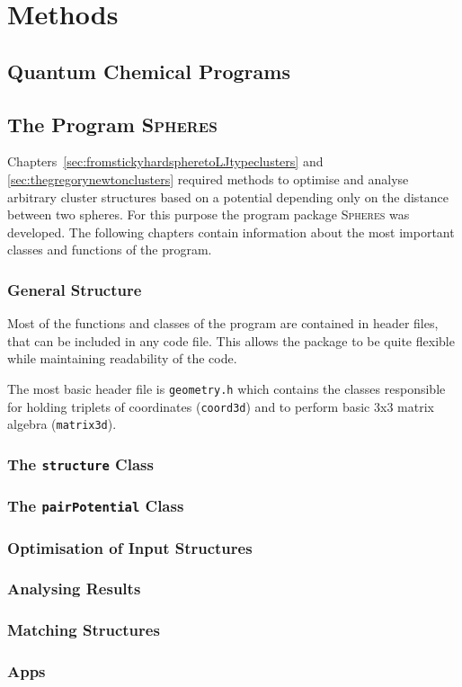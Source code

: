 
\part{Methods}
\label{sec:methods}

\chapter{Quantum Chemical Programs}
\label{sec:quantumchemicalprograms}

\chapter{The Program \textsc{Spheres}}
\label{sec:theprogramspheres}

Chapters~\ref{sec:fromstickyhardspheretoLJtypeclusters} and
\ref{sec:thegregorynewtonclusters} required methods to optimise and analyse
arbitrary cluster structures based on a potential depending only on the
distance between two spheres. For this purpose the program package
\textsc{Spheres} was developed. The following chapters contain information
about the most important classes and functions of the program.

\section{General Structure}
\label{sec:generalstructure}

Most of the functions and classes of the program are contained in header files,
that can be included in any code file. This allows the package to be quite
flexible while maintaining readability of the code.

The most basic header file is \texttt{geometry.h} which contains the classes
responsible for holding triplets of coordinates (\texttt{coord3d}) and to
perform basic 3x3 matrix algebra (\texttt{matrix3d}).

\section{The \texttt{structure} Class}
\label{sec:thestructureclass}



\section{The \texttt{pairPotential} Class}
\label{sec:thepairpotentialclass}

\section{Optimisation of Input Structures}
\label{sec:optimisationofinputstructures}

\section{Analysing Results}
\label{sec:analysingresults}

\section{Matching Structures}
\label{sec:matchingstructures}

\section{Apps}
\label{sec:apps}
